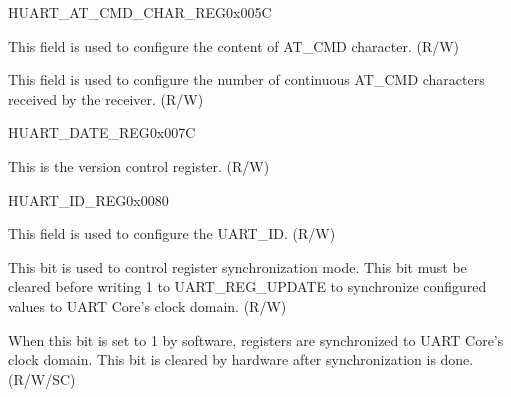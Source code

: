 \begin{register}{H}{UART\_AT\_CMD\_CHAR\_REG}{0x005C}\label{regdesc:UARTATCMDCHARREG}
%
%
%
\regnewline%
\begin{regdesc}\begin{reglist}
\label{fielddesc:UARTATCMDCHAR}\item [UART\_AT\_CMD\_CHAR] This field is used to configure the content of AT\_CMD character. (R/W)
\label{fielddesc:UARTCHARNUM}\item [UART\_CHAR\_NUM] This field is used to configure the number of continuous AT\_CMD characters received by the receiver. (R/W)
\end{reglist}\end{regdesc}
\end{register}


\begin{register}{H}{UART\_DATE\_REG}{0x007C}\label{regdesc:UARTDATEREG}
%
\regnewline%
\begin{regdesc}\begin{reglist}
\label{fielddesc:UARTDATE}\item [UART\_DATE] This is the version control register. (R/W)
\end{reglist}\end{regdesc}
\end{register}


\begin{register}{H}{UART\_ID\_REG}{0x0080}\label{regdesc:UARTIDREG}
%
%
%
\regnewline%
\begin{regdesc}\begin{reglist}
\label{fielddesc:UARTID}\item [UART\_ID] This field is used to configure the UART\_ID. (R/W)
\label{fielddesc:UARTUPDATECTRL}\item [UART\_UPDATE\_CTRL] This bit is used to control register synchronization mode. This bit must be cleared before writing 1 to UART\_REG\_UPDATE to synchronize configured values to UART Core's clock domain. (R/W)
\label{fielddesc:UARTREGUPDATE}\item [UART\_REG\_UPDATE] When this bit is set to 1 by software, registers are synchronized to UART Core's clock domain. This bit is cleared by hardware after synchronization is done. (R/W/SC)
\end{reglist}\end{regdesc}
\end{register}
